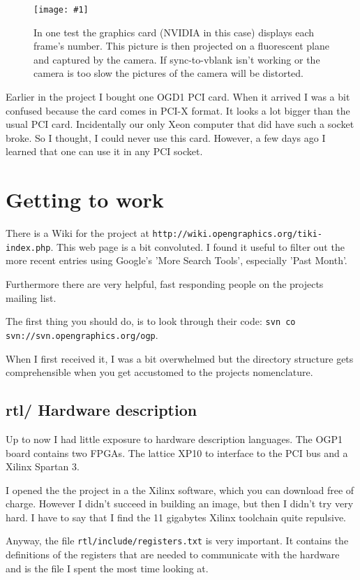 \documentclass[%
  DIV19]{scrartcl}
\newcommand{\bild}[1]{\texttt{[image: \#1]}}
\begin{document}
\begin{figure}
  \centering
  \bild{screen_numbers.png}
  \caption{In one test the graphics card (NVIDIA in this case)
    displays each frame's number. This picture is then projected on a
    fluorescent plane and captured by the camera. If sync-to-vblank
    isn't working or the camera is too slow the pictures of the camera
    will be distorted. }
\end{figure}


Earlier in the project I bought one OGD1 PCI card. When it arrived I
was a bit confused because the card comes in PCI-X format. It looks a
lot bigger than the usual PCI card. Incidentally our only Xeon
computer that did have such a socket broke. So I thought, I could
never use this card. However, a few days ago I learned that one can
use it in any PCI socket.

\section{Getting to work}
There is a Wiki for the project at
\verb!http://wiki.opengraphics.org/tiki-index.php!. This web page is a
bit convoluted. I found it useful to filter out the more recent
entries using Google's 'More Search Tools', especially 'Past Month'.

Furthermore there are very helpful, fast responding people on the
projects mailing list.

The first thing you should do, is to look through their code:
\verb!svn co svn://svn.opengraphics.org/ogp!.

When I first received it, I was a bit overwhelmed but the directory
structure gets comprehensible when you get accustomed to the projects
nomenclature.

\subsection{rtl/ Hardware description}
Up to now I had little exposure to hardware description languages. The
OGP1 board contains two FPGAs. The lattice XP10 to interface to the
PCI bus and a Xilinx Spartan 3.

I opened the the project in a the Xilinx software, which you can
download free of charge. However I didn't succeed in building an
image, but then I didn't try very hard. I have to say that I find the
11 gigabytes Xilinx toolchain quite repulsive.

Anyway, the file \verb!rtl/include/registers.txt! is very
important. It contains the definitions of the registers that are
needed to communicate with the hardware and is the file I spent the
most time looking at.
\end{document}
